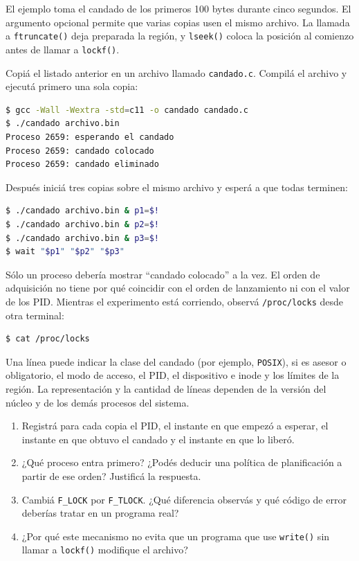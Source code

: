 \documentclass[11pt,a4paper]{article}
\newcommand{\inputcode}[2][]{%
  \par\addvspace{0.2\baselineskip}\noindent
  \begin{minipage}{\linewidth}
    
  \end{minipage}\par\addvspace{0.2\baselineskip}}
\begin{document}
El ejemplo toma el candado de los primeros 100 bytes durante cinco segundos.
El argumento opcional permite que varias copias usen el mismo archivo. La
llamada a \texttt{ftruncate()} deja preparada la región, y
\texttt{lseek()} coloca la posición al comienzo antes de llamar a
\texttt{lockf()}.

\inputcode[language=C,basicstyle=\ttfamily\footnotesize]{../examples/tp5/candado.c}

Copiá el listado anterior en un archivo llamado \texttt{candado.c}. Compilá el
archivo y ejecutá primero una sola copia:

\begin{lstlisting}[language=bash]
$ gcc -Wall -Wextra -std=c11 -o candado candado.c
$ ./candado archivo.bin
Proceso 2659: esperando el candado
Proceso 2659: candado colocado
Proceso 2659: candado eliminado
\end{lstlisting}

Después iniciá tres copias sobre el mismo archivo y esperá a que todas
terminen:

\begin{lstlisting}[language=bash]
$ ./candado archivo.bin & p1=$!
$ ./candado archivo.bin & p2=$!
$ ./candado archivo.bin & p3=$!
$ wait "$p1" "$p2" "$p3"
\end{lstlisting}

Sólo un proceso debería mostrar ``candado colocado'' a la vez. El orden de
adquisición no tiene por qué coincidir con el orden de lanzamiento ni con el
valor de los PID. Mientras el experimento está corriendo, observá
\texttt{/proc/locks} desde otra terminal:

\begin{lstlisting}[language=bash]
$ cat /proc/locks
\end{lstlisting}

Una línea puede indicar la clase del candado (por ejemplo, \texttt{POSIX}), si
es asesor o obligatorio, el modo de acceso, el PID, el dispositivo e inode y
los límites de la región. La representación y la cantidad de líneas dependen
de la versión del núcleo y de los demás procesos del sistema.

\begin{enumerate}
  \item Registrá para cada copia el PID, el instante en que empezó a esperar,
  el instante en que obtuvo el candado y el instante en que lo liberó.
  \item ¿Qué proceso entra primero? ¿Podés deducir una política de
  planificación a partir de ese orden? Justificá la respuesta.
  \item Cambiá \texttt{F\_LOCK} por \texttt{F\_TLOCK}. ¿Qué diferencia
  observás y qué código de error deberías tratar en un programa real?
  \item ¿Por qué este mecanismo no evita que un programa que use
  \texttt{write()} sin llamar a \texttt{lockf()} modifique el archivo?
\end{enumerate}
\end{document}
